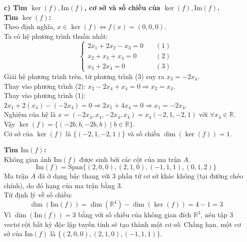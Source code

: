\documentclass[12pt,a4paper]{article}
\begin{document}
\vspace{0.5cm}

\textbf{c) Tìm $\ker(f), \text{Im}(f)$, cơ sở và số chiều của $\ker(f), \text{Im}(f)$.}\\
\textbf{Tìm $\ker(f)$:}\\
Theo định nghĩa, $x \in \ker(f) \Leftrightarrow f(x) = (0,0,0)$.\\
Ta có hệ phương trình thuần nhất:
$$\begin{cases}
2x_1 + 2x_2 - x_3 = 0 \quad &(1) \\
x_2 + x_3 + x_4 = 0 \quad &(2) \\
x_3 + 2x_4 = 0 \quad &(3)
\end{cases}$$
Giải hệ phương trình trên, từ phương trình (3) suy ra $x_3 = -2x_4$.\\
Thay vào phương trình (2): $x_2 - 2x_4 + x_4 = 0 \Rightarrow x_2 = x_4$.\\
Thay vào phương trình (1): $2x_1 + 2(x_4) - (-2x_4) = 0 \Rightarrow 2x_1 + 4x_4 = 0 \Rightarrow x_1 = -2x_4$.\\
Nghiệm của hệ là $x = (-2x_4, x_4, -2x_4, x_4) = x_4(-2, 1, -2, 1)$ với $\forall x_4 \in \mathbb{R}$.\\
Vậy $\ker(f) = \{(-2b, b, -2b, b) \mid b \in \mathbb{R}\}$.\\
Cơ sở của $\ker(f)$ là $\{(-2, 1, -2, 1)\}$ và số chiều $\dim(\ker(f)) = 1$.

\textbf{Tìm $\text{Im}(f)$:}\\
Không gian ảnh $\text{Im}(f)$ được sinh bởi các cột của ma trận $A$.
$$\text{Im}(f) = \text{Span}\{(2,0,0), (2,1,0), (-1,1,1), (0,1,2)\}$$
Ma trận $A$ đã ở dạng bậc thang với 3 phần tử cơ sở khác không (tại đường chéo chính), do đó hạng của ma trận bằng 3.\\
Từ định lý về số chiều: 
$$\dim(\text{Im}(f)) = \dim(\mathbb{R}^4) - \dim(\ker(f)) = 4 - 1 = 3$$
Vì $\dim(\text{Im}(f)) = 3$ bằng với số chiều của không gian đích $\mathbb{R}^3$, nên tập 3 vectơ cột bất kỳ độc lập tuyến tính sẽ tạo thành một cơ sở. Chẳng hạn, một cơ sở của $\text{Im}(f)$ là $\{(2,0,0), (2,1,0), (-1,1,1)\}$.
\end{document}
